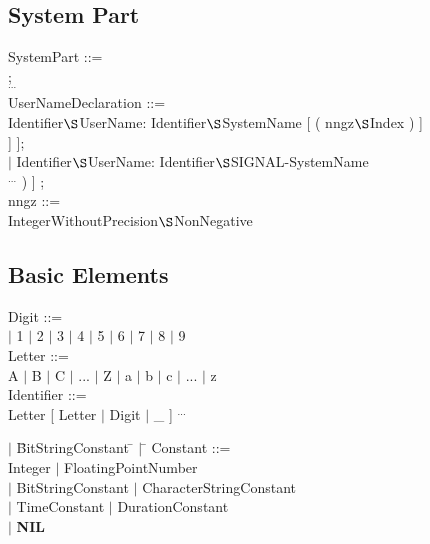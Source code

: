 \subsection{System Part}   %

SystemPart ::= \\
 ;\\
\x {} $^{...}$\\

UserNameDeclaration ::=\\
\x Identifier$\S $UserName: Identifier$\S $SystemName [ ( nngz$\S $Index ) ]\\
\x \x [ $^*$ nngz$\S $Channel [ $^*$ nngz$\S $Position [ , nngz$\S $Width ] ] ];\\
\x $\mid$ Identifier$\S $UserName: Identifier$\S $SIGNAL-SystemName\\
\x \x [ ( Identifier$\S $ErrorNumber [ , Identifier$\S $ErrorNumber ] $^{...}$ ) ] ;\\

nngz ::= \\
\x IntegerWithoutPrecision$\S $NonNegative

\subsection{Basic Elements}    %

Digit ::=\\
 $\mid$ 1 $\mid$ 2 $\mid$ 3 $\mid$ 4 $\mid$ 5 $\mid$ 6 $\mid$ 7 $\mid$ 8 $\mid$ 9\\

Letter ::= \\
A $\mid$ B $\mid$ C $\mid$ ... $\mid$ Z $\mid$ a $\mid$ b $\mid$ c $\mid$ ... $\mid$ z\\

Identifier ::=\\
Letter [ Letter $\mid$ Digit $\mid$ \_ ] $^{...}$\\

\begin{tabbing}
\x $\mid$ \= BitStringConstant \= $\mid$ \= \kill
Constant ::= \> \> \> \\
          \> Integer           \> $\mid$ \> FloatingPointNumber\\
\x $\mid$ \> BitStringConstant \> $\mid$ \> CharacterStringConstant\\
\x $\mid$ \> TimeConstant      \> $\mid$ \> DurationConstant\\
\x $\mid$ \> {\bf NIL}         \> \> 
\end{tabbing}

